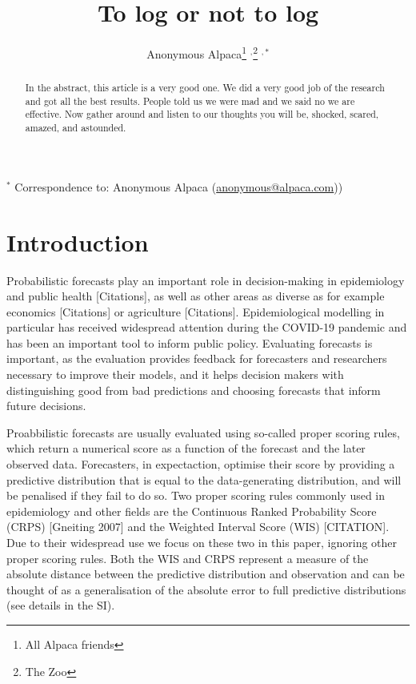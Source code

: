 \documentclass{article}
\begin{document}
\title{To log or not to log}
  \author{Anonymous Alpaca\thanks{All Alpaca friends} $^{,}$\thanks{The Zoo} $^{ , *}$}

\maketitle

\tableofcontents

\begin{abstract}
In the abstract, this article is a very good one. We did a very good job of the research and got all the best results. People told us we were mad and we said no we are effective. Now gather around and listen to our thoughts you will be, shocked, scared, amazed, and astounded.
\end{abstract}

\bigskip

{\footnotesize $^*$ Correspondence to: Anonymous Alpaca (\url{anonymous@alpaca.com}))}



\newpage


\section{Introduction}

Probabilistic forecasts play an important role in decision-making in epidemiology and public health [Citations], as well as other areas as diverse as for example economics [Citations] or agriculture [Citations]. Epidemiological modelling in particular has received widespread attention during the COVID-19 pandemic and has been an important tool to inform public policy. Evaluating forecasts is important, as the evaluation provides feedback for forecasters and researchers necessary to improve their models, and it helps decision makers with distinguishing good from bad predictions and choosing forecasts that inform future decisions.

Proabbilistic forecasts are usually evaluated using so-called proper scoring rules, which return a numerical score as a function of the forecast and the later observed data. Forecasters, in expectaction, optimise their score by providing a predictive distribution that is equal to the data-generating distribution, and will be penalised if they fail to do so. Two proper scoring rules commonly used in epidemiology and other fields are the Continuous Ranked Probability Score (CRPS) [Gneiting 2007] and the Weighted Interval Score (WIS) [CITATION]. Due to their widespread use we focus on these two in this paper, ignoring other proper scoring rules. Both the WIS and CRPS represent a measure of the absolute distance between the predictive distribution and observation and can be thought of as a generalisation of the absolute error to full predictive distributions (see details in the SI). 
\end{document}

